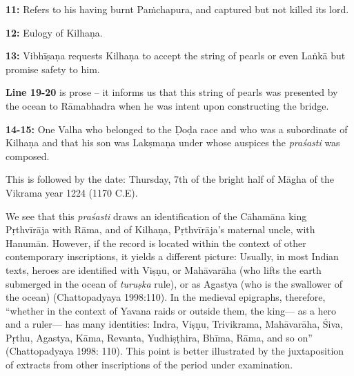 \smallskip
\noindent
{\bf 11:} Refers to his having burnt Paṁchapura, and captured but not killed its lord.

\smallskip
\noindent
{\bf 12:} Eulogy of Kilhaṇa.

\smallskip
\noindent
{\bf 13:} Vibhīṣaṇa requests Kilhaṇa to accept the string of pearls or even Laṅkā but promise safety to him.

\smallskip
\noindent
{\bf Line 19-20} is prose – it informs us that this string of pearls was presented by the ocean to Rāmabhadra when he was intent upon constructing the bridge.



\noindent
{\bf 14-15:} One Valha who belonged to the Ḍoḍa race and who was a subordinate of Kilhaṇa and that his son was Lakṣmaṇa under whose auspices the {\sl praśasti} was composed.

This is followed by the date: Thursday, 7th of the bright half of Māgha of the Vikrama year 1224 (1170 C.E).

\newpage

We see that this {\sl praśasti} draws an identification of the Cāhamāna king Pṛthvīrāja with Rāma, and of Kilhaṇa, Pṛthvīrāja’s maternal uncle, with Hanumān. However, if the record is located within the context of other contemporary inscriptions, it yields a different picture: Usually, in most Indian texts, heroes are identified with Viṣṇu, or Mahāvarāha (who lifts the earth submerged in the ocean of {\sl turuṣka} rule), or as Agastya (who is the swallower of the ocean) (Chattopadyaya 1998:110). In the medieval epigraphs, therefore, “whether in the context of Yavana raids or outside them, the king— as a hero and a ruler— has many identities: Indra, Viṣṇu, Trivikrama, Mahāvarāha, Śiva, Pṛthu, Agastya, Kāma, Revanta, Yudhiṣṭhira, Bhīma, Rāma, and so on” (Chattopadyaya 1998: 110). This point is better illustrated by the juxtaposition of extracts from other inscriptions of the period under examination. 

